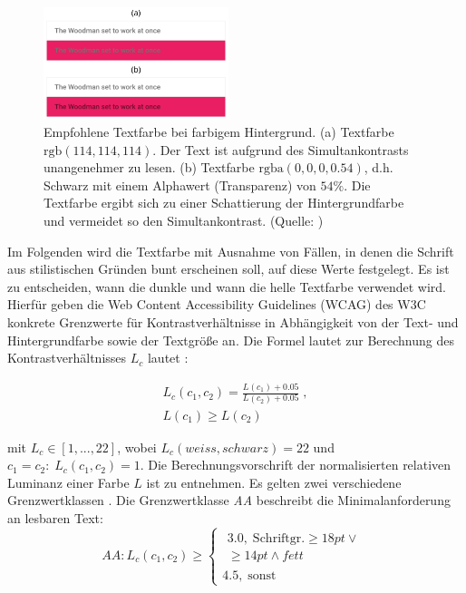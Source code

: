 \documentclass[11pt,a4paper,bibliography=totoc,twocolumn]{scrartcl}
\begin{document}
\begin{figure}[h]
	\centering
	\includegraphics[width=0.48\textwidth]{img/text_color.png}
	\caption{Empfohlene Textfarbe bei farbigem Hintergrund. (a) Textfarbe $\text{rgb}(114,114,114)$. Der Text ist aufgrund des Simultankontrasts unangenehmer zu lesen. (b) Textfarbe $\text{rgba}(0, 0, 0, 0.54)$, d.h. Schwarz mit einem Alphawert (Transparenz) von $54\%$. Die Textfarbe ergibt sich zu einer Schattierung der Hintergrundfarbe und vermeidet so den Simultankontrast. (Quelle: \citep{google})}
	\label{fig:text_color}
\end{figure}

Im Folgenden wird die Textfarbe mit Ausnahme von Fällen, in denen die Schrift aus stilistischen Gründen bunt erscheinen soll, auf diese Werte festgelegt. Es ist zu entscheiden, wann die dunkle und wann die helle Textfarbe verwendet wird. Hierfür geben die Web Content Accessibility Guidelines (WCAG) des W3C konkrete Grenzwerte für Kontrastverhältnisse in Abhängigkeit von der Text- und Hintergrundfarbe sowie der Textgröße an. Die Formel lautet zur Berechnung des Kontrastverhältnisses $L_c$ lautet \citep{wcag-contrast}:

\begin{equation}
	\begin{split}
		L_c(c_1, c_2) = \frac{L(c_1) + 0.05}{L(c_2) + 0.05} \;,\\ L(c_1) \geq L(c_2)
	\end{split}
\end{equation}

mit $L_c \in [1, ... , 22]$, wobei $L_c(weiss, schwarz) = 22$ und $c_1 = c_2: \;L_c(c_1, c_2) = 1$. Die Berechnungsvorschrift der normalisierten relativen Luminanz einer Farbe $L$ ist \citep{wcag-rel-luminance} zu entnehmen.
Es gelten zwei verschiedene Grenzwertklassen \citep{wcag}. Die Grenzwertklasse \emph{AA} beschreibt die Minimalanforderung an lesbaren Text:
\begin{equation}
  	AA: L_c(c_1, c_2) \geq
	\begin{cases}
		\begin{split}3.0, \; \text{Schriftgr.} \geq 18pt \lor \\ \geq 14pt \land fett\end{split} \\
		4.5,  \;  \text{sonst}
	\end{cases}
\end{equation}
\end{document}
